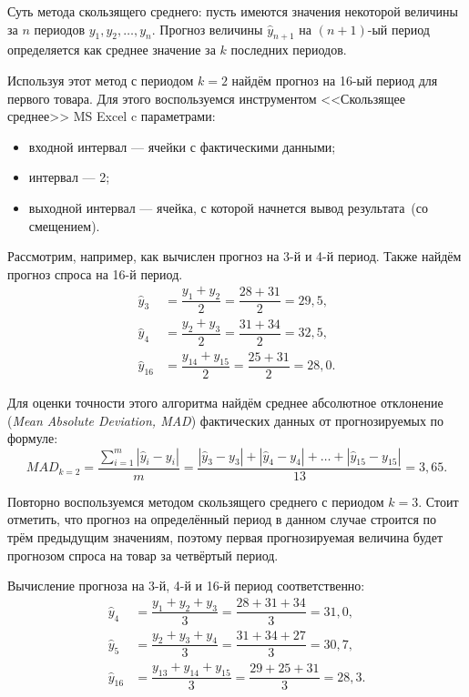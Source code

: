 Суть метода скользящего среднего: пусть имеются значения некоторой
величины за $n$ периодов $y_1, y_2, \dots, y_n$.
Прогноз величины $\hat{y}_{n+1}$ на $(n+1)\text{-ый}$ период определяется как
среднее значение за $k$ последних периодов.

Используя этот метод с периодом $k=2$ найдём прогноз на 16-ый период
для первого товара. Для этого воспользуемся инструментом
<<Скользящее среднее>> MS Excel c параметрами:
\begin{itemize}
  \item входной интервал --- ячейки с фактическими данными;
  \item интервал --- 2;
  \item выходной интервал --- ячейка, с которой начнется вывод результата~(со смещением).
\end{itemize}


Рассмотрим, например, как вычислен прогноз на 3-й и 4-й период. Также найдём
прогноз спроса на 16-й период.
\begin{align*}
  \hat{y}_3 &= \dfrac{y_1 + y_2}{2} = \dfrac{28 + 31}{2} = 29{,}5, \\
  \hat{y}_4 &= \dfrac{y_2 + y_3}{2} = \dfrac{31 + 34}{2} = 32{,}5, \\
  \hat{y}_{16} &= \dfrac{y_{14} + y_{15}}{2} = \dfrac{25 + 31}{2} = 28{,}0.
\end{align*}

Для оценки точности этого алгоритма найдём среднее абсолютное отклонение
(\textit{Mean Absolute Deviation, MAD}) фактических данных от прогнозируемых по формуле:
\[
  MAD_{k=2} = \dfrac{\sum_{i=1}^{m} |\hat{y}_i - y_i| }{m} = \dfrac{|\hat{y}_3 - y_3| + |\hat{y}_4 - y_4| + \dots + |\hat{y}_{15} - y_{15}|}{13} = 3{,}65.
\]

Повторно воспользуемся методом скользящего среднего с периодом $k=3$.
Стоит отметить, что прогноз на определённый период в данном случае строится
по трём предыдущим значениям, поэтому первая прогнозируемая величина будет
прогнозом спроса на товар за четвёртый период.

Вычисление прогноза на 3-й, 4-й и 16-й период соответственно:
\begin{align*}
  \hat{y}_4 &= \dfrac{y_1 + y_2 + y_3}{3} = \dfrac{28 + 31 + 34}{3} = 31{,}0, \\
  \hat{y}_5 &= \dfrac{y_2 + y_3 + y_4}{3} = \dfrac{31 + 34 + 27}{3} = 30{,}7, \\
  \hat{y}_{16} &= \dfrac{y_{13} + y_{14} + y_{15}}{3} = \dfrac{29 + 25 + 31}{3} = 28{,}3.
\end{align*}

